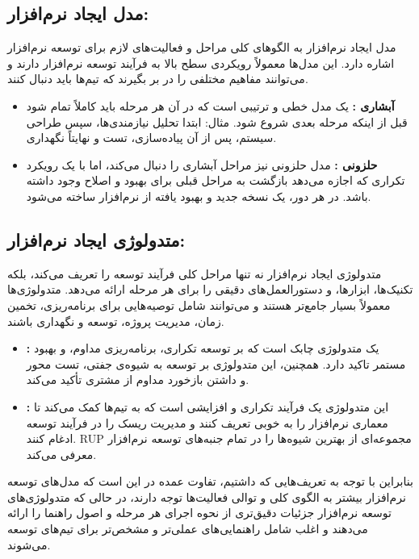 \subsection*{مدل ایجاد نرم‌افزار:}

مدل ایجاد نرم‌افزار به الگوهای کلی مراحل و فعالیت‌های لازم برای توسعه نرم‌افزار اشاره دارد. این مدل‌ها معمولاً رویکردی سطح بالا به فرآیند توسعه نرم‌افزار دارند و می‌توانند مفاهیم مختلفی را در بر بگیرند که تیم‌ها باید دنبال کنند.

\begin{itemize}
	\item \textbf{آبشاری  :}
یک مدل خطی و ترتیبی است که در آن هر مرحله باید کاملاً تمام شود قبل از اینکه مرحله بعدی شروع شود. مثال: ابتدا تحلیل نیازمندی‌ها، سپس طراحی سیستم، پس از آن پیاده‌سازی، تست و نهایتاً نگهداری.
	\item \textbf{حلزونی  :}
مدل حلزونی نیز مراحل آبشاری را دنبال می‌کند، اما با یک رویکرد تکراری که اجازه می‌دهد بازگشت به مراحل قبلی برای بهبود و اصلاح وجود داشته باشد. در هر دور، یک نسخه جدید و بهبود یافته از نرم‌افزار ساخته می‌شود.
\end{itemize}

\subsection*{متدولوژی ایجاد نرم‌افزار:}

متدولوژی ایجاد نرم‌افزار نه تنها مراحل کلی فرآیند توسعه را تعریف می‌کند، بلکه تکنیک‌ها، ابزارها، و دستورالعمل‌های دقیقی را برای هر مرحله ارائه می‌دهد. متدولوژی‌ها معمولاً بسیار جامع‌تر هستند و می‌توانند شامل توصیه‌هایی برای برنامه‌ریزی، تخمین زمان، مدیریت پروژه، توسعه و نگهداری باشند.

\begin{itemize}
	\item \textbf{ :}
یک متدولوژی چابک است که بر توسعه تکراری، برنامه‌ریزی مداوم، و بهبود مستمر تاکید دارد. همچنین، این متدولوژی بر توسعه به شیوه‌ی جفتی، تست محور و داشتن بازخورد مداوم از مشتری تأکید می‌کند.

	\item \textbf{ :}
این متدولوژی یک فرآیند تکراری و افزایشی است که به تیم‌ها کمک می‌کند تا معماری نرم‌افزار را به خوبی تعریف کنند و مدیریت ریسک را در فرآیند توسعه ادغام کنند. RUP مجموعه‌ای از بهترین شیوه‌ها را در تمام جنبه‌های توسعه نرم‌افزار معرفی می‌کند.
\end{itemize}

بنابراین با توجه به تعریف‌هایی که داشتیم، تفاوت عمده در این است که مدل‌های توسعه نرم‌افزار بیشتر به الگوی کلی و توالی فعالیت‌ها توجه دارند، در حالی که متدولوژی‌های توسعه نرم‌افزار جزئیات دقیق‌تری از نحوه اجرای هر مرحله و اصول راهنما را ارائه می‌دهند و اغلب شامل راهنمایی‌های عملی‌تر و مشخص‌تر برای تیم‌های توسعه می‌شوند.

